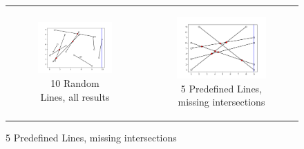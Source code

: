 \documentclass [12pt]{article}
\begin{document}
\begin{figure}[h]
\begin{tabular}{cc}
\begin{subfigure}{0.5\textwidth}
        \includegraphics[width=\textwidth]{images/10LinesOkay.png}
        \caption{10 Random Lines, all results}
        \end{subfigure} &
        \begin{subfigure}{0.5\textwidth}
            \centering
        \includegraphics[width=\textwidth]{images/5LinesWrong.png}
        \caption{5 Predefined Lines, missing intersections}
        \end{subfigure}
    \end{tabular}
\end{figure}

\end{document}
